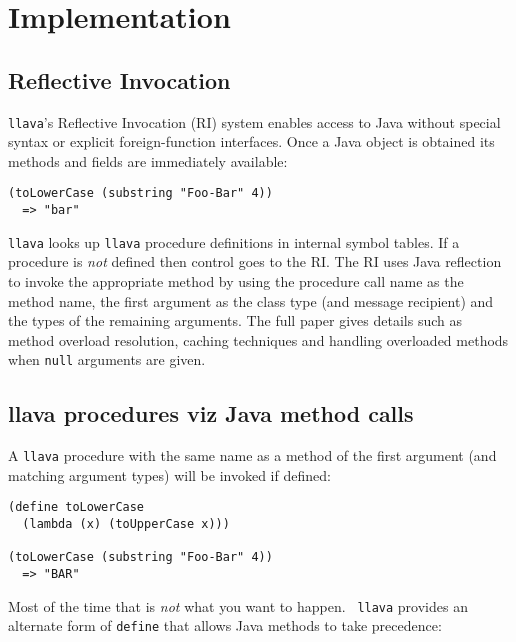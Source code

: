 \documentclass{acm-final/sig-alternate-modified}
\begin{document}
\section{Implementation}

\subsection{Reflective Invocation}

{\tt llava}'s Reflective Invocation (RI) system enables access to Java
without special syntax or explicit foreign-function interfaces.  Once
a Java object is obtained its methods and fields are immediately
available:

\small
\begin{verbatim}
(toLowerCase (substring "Foo-Bar" 4))
  => "bar"
\end{verbatim}
\normalsize

{\tt llava} looks up {\tt llava} procedure definitions in internal
symbol tables.  If a procedure is \emph{not} defined then control goes
to the RI.  The RI uses Java reflection to invoke the appropriate
method by using the procedure call name as the method name, the first
argument as the class type (and message recipient) and the types of
the remaining arguments.  The full paper gives details such as method
overload resolution, caching techniques and handling overloaded
methods when {\tt null} arguments are given.

\subsection{llava procedures viz Java method calls}

A {\tt llava} procedure with the same name as a method of the first
argument (and matching argument types) will be invoked if defined:

\small
\begin{verbatim}
(define toLowerCase
  (lambda (x) (toUpperCase x)))

(toLowerCase (substring "Foo-Bar" 4))
  => "BAR"
\end{verbatim}
\normalsize

Most of the time that is \emph{not} what you want to happen.  {\tt
llava} provides an alternate form of {\tt define} that allows Java
methods to take precedence:
\end{document}
